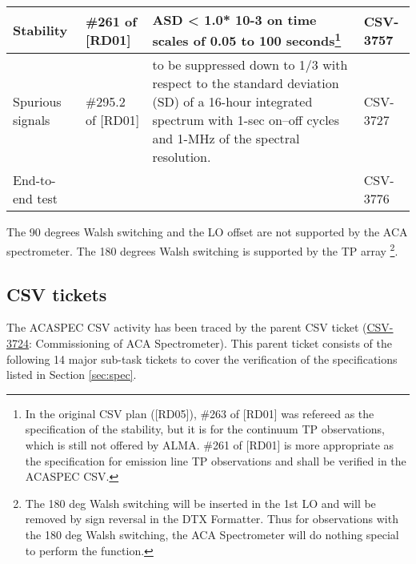 \begin{longtable}{|p{3cm}|p{2cm}|p{6cm}|p{2cm}|}
Stability                         & \#261 of {[}RD01{]}                          &  ASD < 1.0* 10-3 on time scales of 0.05 to 100 seconds\footnote{In the original CSV plan ({[}RD05{]}), \#263 of {[}RD01{]} was refereed as the specification of the stability, but it is for the continuum TP observations, which is still not offered by ALMA. \#261 of {[}RD01{]} is more appropriate as the specification for emission line TP observations and shall be verified in the ACASPEC CSV.} & CSV-3757                                                           \\ \hline
Spurious signals                  & \#295.2 of {[}RD01{]}                        & to be suppressed down to 1/3 with respect to the standard deviation (SD) of a 16-hour integrated spectrum with 1-sec on–off cycles and 1-MHz of the spectral resolution.                                                                     & CSV-3727                                                           \\ \hline 
End-to-end test                   &                                              &                                                                                                                                                                                                                                              & CSV-3776                                                           \\ \hline
\end{longtable}

The 90 degrees Walsh switching and the LO offset are not supported by the ACA spectrometer. The 180 degrees Walsh switching is supported by the TP array \footnote{The 180 deg Walsh switching will be inserted in the 1st LO and will be removed by sign reversal in the DTX Formatter. Thus for observations with the 180 deg Walsh switching, the ACA Spectrometer will do nothing special to perform the function.}. 

\newpage
\subsection{CSV tickets}

The ACASPEC CSV activity has been traced by the parent CSV ticket (\href{https://jira.alma.cl/browse/CSV-3724}{CSV-3724}: Commissioning of ACA Spectrometer). 
This parent ticket consists of the following 14 major sub-task tickets to cover the verification of the specifications listed in Section \ref{sec:spec}.  


